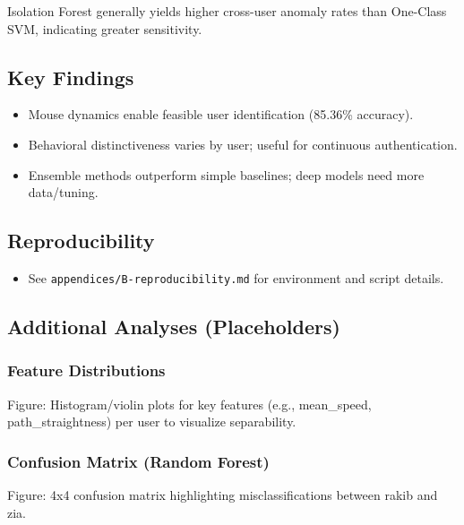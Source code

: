 \documentclass[
  12pt,
]{article}
\providecommand{\tightlist}{%
  \setlength{\itemsep}{0pt}\setlength{\parskip}{0pt}}
\begin{document}
Isolation Forest generally yields higher cross-user anomaly rates than
One-Class SVM, indicating greater sensitivity.

\subsection{Key Findings}\label{key-findings}

\begin{itemize}
\tightlist
\item
  Mouse dynamics enable feasible user identification (85.36\% accuracy).
\item
  Behavioral distinctiveness varies by user; useful for continuous
  authentication.
\item
  Ensemble methods outperform simple baselines; deep models need more
  data/tuning.
\end{itemize}

\subsection{Reproducibility}\label{reproducibility}

\begin{itemize}
\tightlist
\item
  See \texttt{appendices/B-reproducibility.md} for environment and
  script details.
\end{itemize}

\subsection{Additional Analyses
(Placeholders)}\label{additional-analyses-placeholders}

\subsubsection{Feature Distributions}\label{feature-distributions}

Figure: Histogram/violin plots for key features (e.g., mean\_speed,
path\_straightness) per user to visualize separability.

\subsubsection{Confusion Matrix (Random
Forest)}\label{confusion-matrix-random-forest}

Figure: 4x4 confusion matrix highlighting misclassifications between
rakib and zia.
\end{document}
